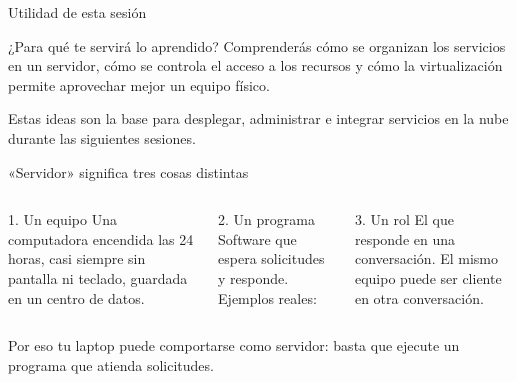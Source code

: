 \documentclass[aspectratio=169,10pt,c]{beamer}
\begin{document}
\begin{frame}{Utilidad de esta sesión}
\begin{block}{¿Para qué te servirá lo aprendido?}
Comprenderás cómo se organizan los servicios en un servidor, cómo se controla el acceso a los recursos y cómo la virtualización permite aprovechar mejor un equipo físico.
\end{block}
\vspace{0.2cm}
\small Estas ideas son la base para desplegar, administrar e integrar servicios en la nube durante las siguientes sesiones.
\end{frame}

\begin{frame}{«Servidor» significa tres cosas distintas}
\begin{columns}[T,onlytextwidth]
\begin{block}{1. Un equipo}
\small Una computadora encendida las 24 horas, casi siempre sin pantalla ni teclado, guardada en un centro de datos.
\end{block}
\begin{block}{2. Un programa}
\small Software que espera solicitudes y responde. Ejemplos reales:   
\end{block}
\begin{block}{3. Un rol}
\small El que responde en una conversación. El mismo equipo puede ser cliente en otra conversación.
\end{block}
\end{columns}
\vspace{0.2cm}
\vspace{0.1cm}
\small Por eso tu laptop puede comportarse como servidor: basta que ejecute un programa que atienda solicitudes.
\end{frame}
\end{document}
